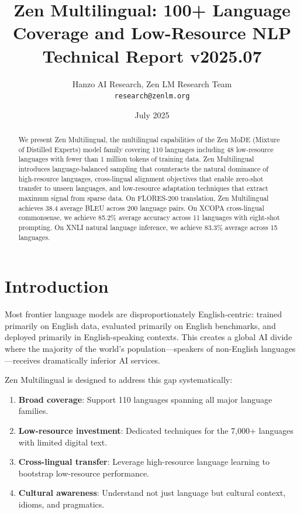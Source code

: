 \documentclass[11pt,a4paper]{article}
\title{\textbf{Zen Multilingual: 100+ Language Coverage and Low-Resource NLP}\\
\large Technical Report v2025.07}
\author{Hanzo AI Research, Zen LM Research Team\\
\texttt{research@zenlm.org}}
\date{July 2025}
\begin{document}
\maketitle

\begin{abstract}
We present Zen Multilingual, the multilingual capabilities of the Zen MoDE (Mixture of Distilled Experts) model family covering 110 languages including 48 low-resource languages with fewer than 1 million tokens of training data. Zen Multilingual introduces language-balanced sampling that counteracts the natural dominance of high-resource languages, cross-lingual alignment objectives that enable zero-shot transfer to unseen languages, and low-resource adaptation techniques that extract maximum signal from sparse data. On FLORES-200 translation, Zen Multilingual achieves 38.4 average BLEU across 200 language pairs. On XCOPA cross-lingual commonsense, we achieve 85.2\% average accuracy across 11 languages with eight-shot prompting. On XNLI natural language inference, we achieve 83.3\% average across 15 languages.
\end{abstract}

\section{Introduction}

Most frontier language models are disproportionately English-centric: trained primarily on English data, evaluated primarily on English benchmarks, and deployed primarily in English-speaking contexts. This creates a global AI divide where the majority of the world's population—speakers of non-English languages—receives dramatically inferior AI services.

Zen Multilingual is designed to address this gap systematically:

\begin{enumerate}
  \item \textbf{Broad coverage}: Support 110 languages spanning all major language families.
  \item \textbf{Low-resource investment}: Dedicated techniques for the 7,000+ languages with limited digital text.
  \item \textbf{Cross-lingual transfer}: Leverage high-resource language learning to bootstrap low-resource performance.
  \item \textbf{Cultural awareness}: Understand not just language but cultural context, idioms, and pragmatics.
\end{enumerate}
\end{document}
